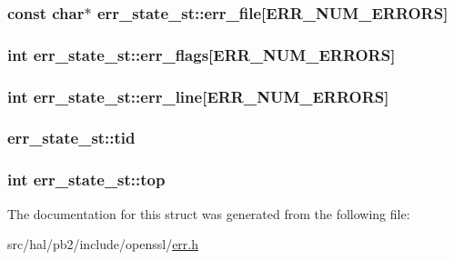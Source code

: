 \subsubsection[{\texorpdfstring{err\+\_\+file}{err_file}}]{\setlength{\rightskip}{0pt plus 5cm}const char$\ast$ err\+\_\+state\+\_\+st\+::err\+\_\+file\mbox{[}{\bf E\+R\+R\+\_\+\+N\+U\+M\+\_\+\+E\+R\+R\+O\+RS}\mbox{]}}\hypertarget{structerr__state__st_aa8ac00e8b6a07603d015b3e067a764ea}{}\label{structerr__state__st_aa8ac00e8b6a07603d015b3e067a764ea}
\subsubsection[{\texorpdfstring{err\+\_\+flags}{err_flags}}]{\setlength{\rightskip}{0pt plus 5cm}int err\+\_\+state\+\_\+st\+::err\+\_\+flags\mbox{[}{\bf E\+R\+R\+\_\+\+N\+U\+M\+\_\+\+E\+R\+R\+O\+RS}\mbox{]}}\hypertarget{structerr__state__st_ae822060964906dc8a605919d29b20a2c}{}\label{structerr__state__st_ae822060964906dc8a605919d29b20a2c}
\subsubsection[{\texorpdfstring{err\+\_\+line}{err_line}}]{\setlength{\rightskip}{0pt plus 5cm}int err\+\_\+state\+\_\+st\+::err\+\_\+line\mbox{[}{\bf E\+R\+R\+\_\+\+N\+U\+M\+\_\+\+E\+R\+R\+O\+RS}\mbox{]}}\hypertarget{structerr__state__st_abdfef5b4788717ba882fda5b02c7597c}{}\label{structerr__state__st_abdfef5b4788717ba882fda5b02c7597c}
\subsubsection[{\texorpdfstring{tid}{tid}}]{ err\+\_\+state\+\_\+st\+::tid}\hypertarget{structerr__state__st_a9bc9ea657d62cb9d4875cdecb09993b4}{}\label{structerr__state__st_a9bc9ea657d62cb9d4875cdecb09993b4}
\subsubsection[{\texorpdfstring{top}{top}}]{\setlength{\rightskip}{0pt plus 5cm}int err\+\_\+state\+\_\+st\+::top}\hypertarget{structerr__state__st_a02b49831a2d90a87b14ae7ad28f0bfb7}{}\label{structerr__state__st_a02b49831a2d90a87b14ae7ad28f0bfb7}


The documentation for this struct was generated from the following file\+:\begin{DoxyCompactItemize}
\item 
src/hal/pb2/include/openssl/\hyperlink{err_8h}{err.\+h}\end{DoxyCompactItemize}
